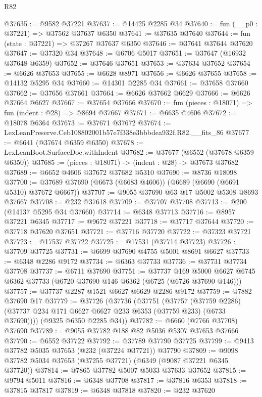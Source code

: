 \begin{lexlean}{R82}
\begin{coremodule}
@37635 := @9582 @37221
@37637 := @14425 @2285 @34
@37640 := fun (__p0 : @37221) => @37562 @37637 @6350
@37641 := @37635 @37640
@37644 := fun (state : @37221) => @37267 @37637 @6350
@37646 := @37641 @37644 @37620
@37647 := @37320 @34
@37648 := @6706 @5017
@37651 := @37647 (@16932 @37648 @6359)
@37652 := @37646 @37651
@37653 := @37634 @37652
@37654 := @6626 @37653
@37655 := @6628 @8971
@37656 := @6626 @37655
@37658 := @14132 @5295 @34
@37660 := @14301 @2285 @34
@37661 := @37658 @37660
@37662 := @37656 @37661
@37664 := @6626 @37662 @6629
@37666 := @6626 @37664 @6627
@37667 := @37654 @37666
@37670 := fun (pieces : @18071) => fun (indent : @28) => @8694 @37667
@37671 := @6635 @4606
@37672 := @18078 @6364
@37673 := @37671 @37672
@37674 := LexLeanPreserve.Ceb108802001b57e7f338e3bbbdea932f.R82.__fits_86
@37677 := @6641 (@37674 @6359 @6350)
@37678 := LexLeanBoot.SurfaceDoc.withIndent
@37682 := @37677 (@6552 (@37678 @6359 @6350))
@37685 := (pieces : @18071) -> (indent : @28) -> @37673 @37682
@37689 := @6652 @4606 @37672 @37682 @5310
@37690 := @8736 @18098
@37700 := @37689 @37690 (@6673 (@6683 @4606)) (@6689 (@6690 (@6691 @5310) @37672 @6667))
@37707 := @9055 @37690 @63 @17 @5002 @5308 @8693 @37667
@37708 := @232 @37618
@37709 := @37707 @37708
@37713 := @200 (@14137 @5295 @34 @37660)
@37714 := @6348 @37713
@37716 := @8957 @37221 @6345
@37717 := @9672 @37221
@37718 := @37717 @37644
@37720 := @37718 @37620 @37651
@37721 := @37716 @37720
@37722 := @37323 @37721
@37723 := @17537 @37722
@37725 := @17531 (@37714 @37723)
@37726 := @37709 @37725
@37731 := @6699 @37690 @4755 @5001 @8691 @6627
@37733 := @6348 @2286 @9172
@37734 := @6363 @37733
@37736 := @37731 @37734 @37708
@37737 := @6711 @37690
@37751 := @37737
    @169
    @5000
    @6627
    @6745
    @6362
    @37733
    (@6720 @37690 @146 @6362 (@6725 (@6726 @37690 @146)))
@37757 := @37737 @2287 @1521 @6627 @6629 @2286 @9172
@37759 := @7882 @37690 @17
@37779 := @37726
    (@37736
      (@37751
        (@37757
          (@37759 @2286)
          (@37737 @234 @171 @6627 @6627 @233 @6353 (@37759 @233) (@6733 @37690))))
      (@9325 @6350 @2285 @34))
@37782 := @6660 (@7766 @37708) @37690
@37789 := @9055 @37782 @188 @82 @5036 @5307 @37653 @37666
@37790 := @6552 @37722
@37792 := @37789 @37790 @37725
@37799 := @9413 @37782 @5035 @37653 (@232 (@37224 @37721)) @37790
@37809 := @9098 @37782 @5034 @37653 (@37255 @37721) (@6349 (@9087 @37221 @6345 @37720))
@37814 := @7865 @37782 @5007 @5033 @37633 @37652
@37815 := @9794 @5011
@37816 := @6348 @37708
@37817 := @37816 @6353
@37818 := @37815 @37817
@37819 := @6348 @37818
@37820 := @232 @37620

\end{coremodule}
\end{lexlean}
